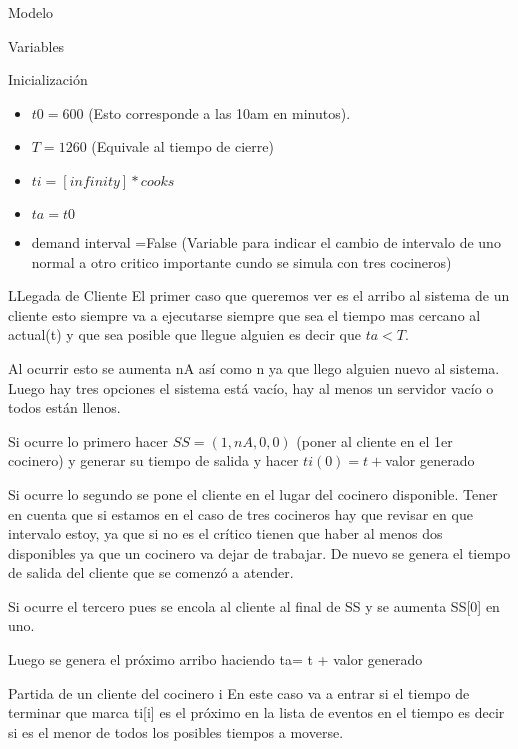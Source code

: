 \documentclass[]{article}
\begin{document}
\begin{section} {Modelo}
\begin{subsection} {Variables }
\begin{itemize}
	\end{itemize}
\end{subsection}


\begin{subsection} {Inicializaci\'{o}n }
	\begin{itemize}
		\item $t0=600$ (Esto corresponde a las 10am en minutos).
		\item $T=1260$ (Equivale al tiempo de cierre)
		\item $ti=[infinity]*cooks$ 
		\item $ta=t0$
		\item demand interval =False  (Variable para indicar el cambio de intervalo de uno normal a otro critico importante cundo se simula con tres cocineros)

	\end{itemize}
	
\end{subsection}

\begin{subsection} {LLegada de Cliente}
	El primer caso que queremos ver es el arribo al sistema de un cliente esto siempre va a ejecutarse siempre que sea el tiempo mas cercano al actual(t) y que sea posible que llegue alguien es decir que $ta<T$.
	
	Al ocurrir esto se aumenta nA as\'{i} como n ya que llego alguien nuevo al sistema. Luego hay tres opciones el sistema est\'{a} vac\'{i}o, hay al menos un servidor vac\'{i}o o todos est\'{a}n llenos.
	
	Si ocurre lo primero hacer $SS = (1, nA , 0 ,0)$ (poner al cliente en el 1er cocinero) y generar su tiempo de salida y hacer $ti(0) = t +$valor generado 
	
	Si ocurre lo segundo se pone el cliente en el lugar del cocinero disponible. Tener en cuenta que si estamos en el caso de tres cocineros hay que revisar en que intervalo estoy, ya que si no es el cr\'{i}tico tienen que haber al menos dos disponibles ya que un cocinero va dejar de trabajar. De nuevo se genera el tiempo de salida del cliente que se comenz\'{o} a atender.
	
	Si ocurre el tercero pues se encola al cliente al final de SS y se aumenta SS[0] en uno.
	
	Luego se genera el pr\'{o}ximo arribo haciendo ta= t + valor generado 
	   
	
\end{subsection}

\begin{subsection} {Partida de un cliente del cocinero i}
	En este caso va a entrar si el tiempo de terminar que marca ti[i] es el pr\'{o}ximo en la lista de eventos en el tiempo es decir si es el menor de todos los posibles tiempos a moverse.
	

\end{subsection}
\end{section}
\end{document}
